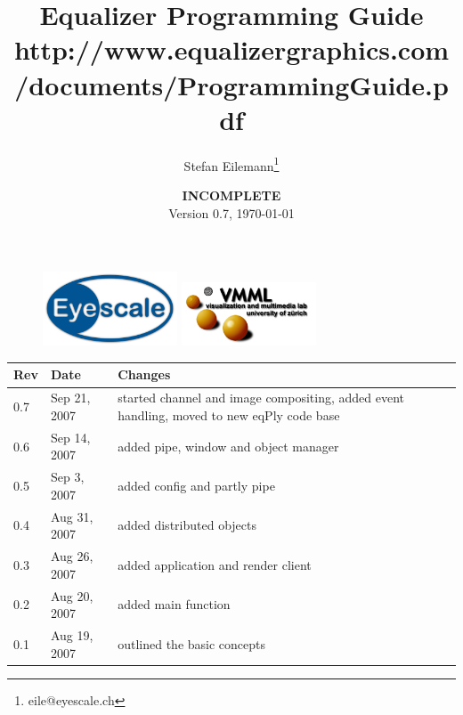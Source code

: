 \documentclass[10pt,a4]{scrartcl}
\title{Equalizer Programming Guide\\
  {\footnotesize\mdseries
    \htmladdnormallink{http://www.equalizergraphics.com/documents/Developer/ProgrammingGuide.pdf}
    {http://www.equalizergraphics.com/documents/ProgrammingGuide.pdf}}
}
\author{Stefan Eilemann\thanks{eile@eyescale.ch}\\[\medskipamount]
}
\date{
  \textbf{INCOMPLETE}\\[\medskipamount]
  Version 0.7, \today
}
\begin{document}
\maketitle
\vfill
\lstset{language=C++}

\thispagestyle{empty}
\begin{figure}[ht]
  \hfill
  \includegraphics[width=4cm]{images/logo.pdf}\hfill
  \includegraphics[width=4cm]{images/vmml.pdf}\hfill\vspace{-1em}\\
\end{figure}
\vfill



\clearpage
\tableofcontents
\thispagestyle{empty}
\vfill{\center\begin{tabularx}{\textwidth}{|l|l|X|}
    \hline
    \bf Rev & \bf Date     & \bf Changes \\
    \hline
    0.7     & Sep 21, 2007 & started channel and image compositing,
                             added event handling, moved to new eqPly
                             code base\\
    0.6     & Sep 14, 2007 & added pipe, window and object manager\\
    0.5     & Sep 3,  2007 & added config and partly pipe\\
    0.4     & Aug 31, 2007 & added distributed objects\\
    0.3     & Aug 26, 2007 & added application and render client\\
    0.2     & Aug 20, 2007 & added main function\\
    0.1     & Aug 19, 2007 & outlined the basic concepts\\
    \hline
  \end{tabularx}}
\thispagestyle{empty}
\clearpage
\end{document}
